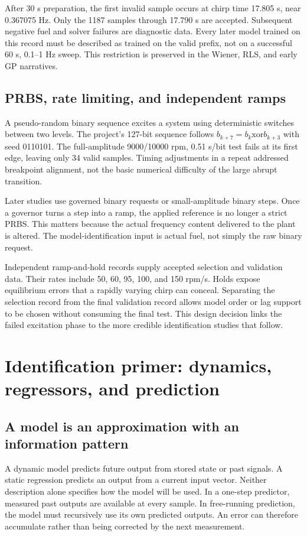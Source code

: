 After 30 s preparation, the first invalid sample occurs at chirp time 17.805 s, near 0.367075 Hz. Only the 1187 samples through 17.790 s are accepted. Subsequent negative fuel and solver failures are diagnostic data. Every later model trained on this record must be described as trained on the valid prefix, not on a successful 60 s, 0.1--1 Hz sweep. This restriction is preserved in the Wiener, RLS, and early GP narratives.

\section{PRBS, rate limiting, and independent ramps}
A pseudo-random binary sequence excites a system using deterministic switches between two levels. The project's 127-bit sequence follows $b_{k+7}=b_k\mathbin{\mathrm{xor}}b_{k+3}$ with seed 0110101. The full-amplitude 9000/10000 rpm, 0.51 s/bit test fails at its first edge, leaving only 34 valid samples. Timing adjustments in a repeat addressed breakpoint alignment, not the basic numerical difficulty of the large abrupt transition.

Later studies use governed binary requests or small-amplitude binary steps. Once a governor turns a step into a ramp, the applied reference is no longer a strict PRBS. This matters because the actual frequency content delivered to the plant is altered. The model-identification input is actual fuel, not simply the raw binary request.

Independent ramp-and-hold records supply accepted selection and validation data. Their rates include 50, 60, 95, 100, and 150 rpm/s. Holds expose equilibrium errors that a rapidly varying chirp can conceal. Separating the selection record from the final validation record allows model order or lag support to be chosen without consuming the final test. This design decision links the failed excitation phase to the more credible identification studies that follow.

\chapter{Identification primer: dynamics, regressors, and prediction}
\section{A model is an approximation with an information pattern}
A dynamic model predicts future output from stored state or past signals. A static regression predicts an output from a current input vector. Neither description alone specifies how the model will be used. In a one-step predictor, measured past outputs are available at every sample. In free-running prediction, the model must recursively use its own predicted outputs. An error can therefore accumulate rather than being corrected by the next measurement.

